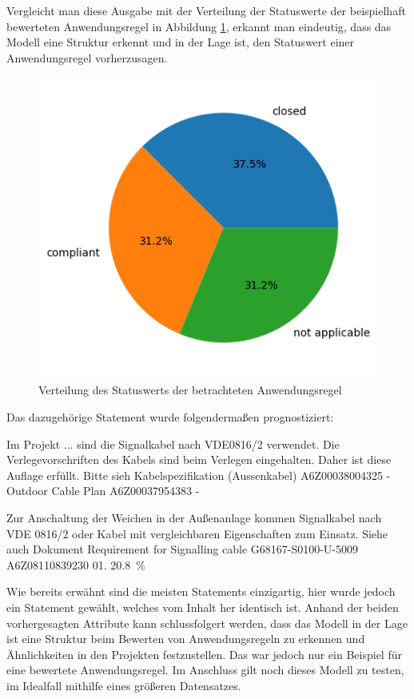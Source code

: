 Vergleicht man diese Ausgabe mit der Verteilung der Statuswerte der beispielhaft bewerteten Anwendungsregel in Abbildung \ref*{fig:StatusTest}, erkannt man eindeutig, 
dass das Modell eine Struktur erkennt und in der Lage ist, den Statuswert einer Anwendungsregel vorherzusagen.
\begin{figure}[H]
    \centering
    \includegraphics[width=.5\textwidth]{abbildungen/StatusTest.png}
    \caption{Verteilung des Statuswerts der betrachteten Anwendungsregel}
    \label{fig:StatusTest}
\end{figure}
Das dazugehörige Statement wurde folgendermaßen prognostiziert:
\begin{description}[style=multiline,leftmargin=3cm,font=\bfseries, nolistsep]
    \item[Real]         Im Projekt ... sind die Signalkabel nach VDE0816/2 verwendet. Die Verlegevorschriften des Kabels sind beim Verlegen eingehalten. Daher ist diese Auflage erfüllt.  Bitte sieh  Kabelspezifikation (Aussenkabel)  A6Z00038004325  -  Outdoor Cable Plan  A6Z00037954383  -
    \item[Prediction]   Zur Anschaltung der Weichen in der Außenanlage kommen Signalkabel nach  VDE 0816/2 oder Kabel mit vergleichbaren Eigenschaften zum Einsatz. Siehe  auch Dokument Requirement for Signalling cable G68167-S0100-U-5009   A6Z08110839230  01.  20.8~\%
\end{description}
Wie bereits erwähnt sind die meisten Statements einzigartig, hier wurde jedoch ein Statement gewählt, welches vom Inhalt her identisch ist. Anhand der beiden vorhergesagten Attribute
kann schlussfolgert werden, dass das Modell in der Lage ist eine Struktur beim Bewerten von Anwendungsregeln zu erkennen und Ähnlichkeiten in den Projekten festzustellen. Das war jedoch
nur ein Beispiel für eine bewertete Anwendungsregel. Im Anschluss gilt noch dieses Modell zu testen, im Idealfall mithilfe eines größeren Datensatzes.
